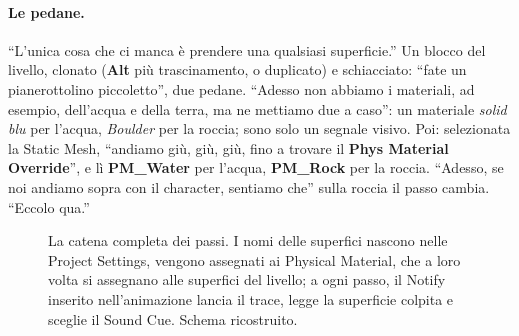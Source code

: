 \paragraph{Le pedane.} ``L'unica cosa che ci manca è prendere una qualsiasi superficie.'' Un
blocco del livello, clonato (\textbf{Alt} più trascinamento, o duplicato) e schiacciato:
``fate un pianerottolino piccoletto'', due pedane. ``Adesso non abbiamo i materiali, ad
esempio, dell'acqua e della terra, ma ne mettiamo due a caso'': un materiale \emph{solid
blu} per l'acqua, \emph{Boulder} per la roccia; sono solo un segnale visivo. Poi:
selezionata la Static Mesh, ``andiamo giù, giù, giù, fino a trovare il \textbf{Phys
Material Override}'', e lì \textbf{PM\_Water} per l'acqua, \textbf{PM\_Rock} per la
roccia. ``Adesso, se noi andiamo sopra con il character, sentiamo che'' sulla roccia il
passo cambia. ``Eccolo qua.''

\begin{figure}[htbp]
\centering
{}
\caption{La catena completa dei passi. I nomi delle superfici nascono nelle Project
Settings, vengono assegnati ai Physical Material, che a loro volta si assegnano alle
superfici del livello; a ogni passo, il Notify inserito nell'animazione lancia il trace,
legge la superficie colpita e sceglie il Sound Cue. Schema ricostruito.}
\label{ue10:fig:catena}
\end{figure}

